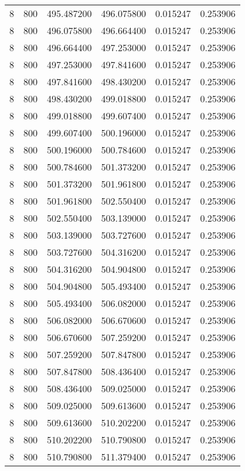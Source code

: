 \begin{longtable}{rrrrrr}
8 & 800 & 495.487200 & 496.075800 & 0.015247 & 0.253906 \\
8 & 800 & 496.075800 & 496.664400 & 0.015247 & 0.253906 \\
8 & 800 & 496.664400 & 497.253000 & 0.015247 & 0.253906 \\
8 & 800 & 497.253000 & 497.841600 & 0.015247 & 0.253906 \\
8 & 800 & 497.841600 & 498.430200 & 0.015247 & 0.253906 \\
8 & 800 & 498.430200 & 499.018800 & 0.015247 & 0.253906 \\
8 & 800 & 499.018800 & 499.607400 & 0.015247 & 0.253906 \\
8 & 800 & 499.607400 & 500.196000 & 0.015247 & 0.253906 \\
8 & 800 & 500.196000 & 500.784600 & 0.015247 & 0.253906 \\
8 & 800 & 500.784600 & 501.373200 & 0.015247 & 0.253906 \\
8 & 800 & 501.373200 & 501.961800 & 0.015247 & 0.253906 \\
8 & 800 & 501.961800 & 502.550400 & 0.015247 & 0.253906 \\
8 & 800 & 502.550400 & 503.139000 & 0.015247 & 0.253906 \\
8 & 800 & 503.139000 & 503.727600 & 0.015247 & 0.253906 \\
8 & 800 & 503.727600 & 504.316200 & 0.015247 & 0.253906 \\
8 & 800 & 504.316200 & 504.904800 & 0.015247 & 0.253906 \\
8 & 800 & 504.904800 & 505.493400 & 0.015247 & 0.253906 \\
8 & 800 & 505.493400 & 506.082000 & 0.015247 & 0.253906 \\
8 & 800 & 506.082000 & 506.670600 & 0.015247 & 0.253906 \\
8 & 800 & 506.670600 & 507.259200 & 0.015247 & 0.253906 \\
8 & 800 & 507.259200 & 507.847800 & 0.015247 & 0.253906 \\
8 & 800 & 507.847800 & 508.436400 & 0.015247 & 0.253906 \\
8 & 800 & 508.436400 & 509.025000 & 0.015247 & 0.253906 \\
8 & 800 & 509.025000 & 509.613600 & 0.015247 & 0.253906 \\
8 & 800 & 509.613600 & 510.202200 & 0.015247 & 0.253906 \\
8 & 800 & 510.202200 & 510.790800 & 0.015247 & 0.253906 \\
8 & 800 & 510.790800 & 511.379400 & 0.015247 & 0.253906 \\

\end{longtable}
